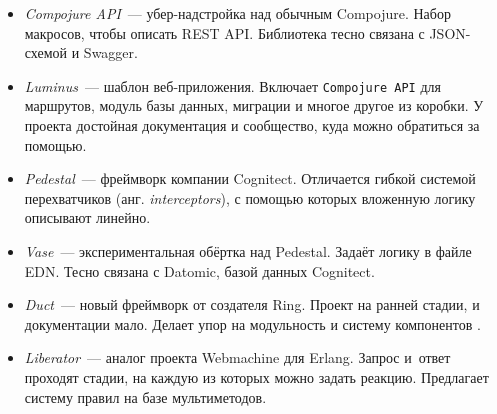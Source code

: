 \begin{itemize}


\item
  \emph{Compojure API}~---
  убер-надстройка над обычным Compojure. Набор макросов, чтобы описать REST
  API. Библиотека тесно связана с JSON-схемой и Swagger.


\item
  \emph{Luminus}~--- шаблон
  веб-приложения. Включает \verb|Compojure API| для маршрутов, модуль базы
  данных, миграции и многое другое из коробки. У проекта достойная документация
  и сообщество, куда можно обратиться за помощью.


\item
  \emph{Pedestal}~--- фреймворк
  компании Cognitect. Отличается гибкой системой перехватчиков
  (анг. \emph{interceptors}), с помощью которых вложенную логику описывают
  линейно.


\item
  \emph{Vase}~---
  экспериментальная обёртка над Pedestal. Задаёт логику в файле
  EDN. Тесно связана с Datomic, базой данных Cognitect.


\item
  \emph{Duct}~--- новый
  фреймворк от создателя Ring. Проект на ранней стадии, и документации
  мало. Делает упор на модульность и систему компонентов .


\item
  \emph{Liberator}~---
  аналог проекта Webmachine для Erlang. Запрос и~ответ проходят стадии, на
  каждую из которых можно задать реакцию. Предлагает систему правил на базе
  мультиметодов.

\end{itemize}

